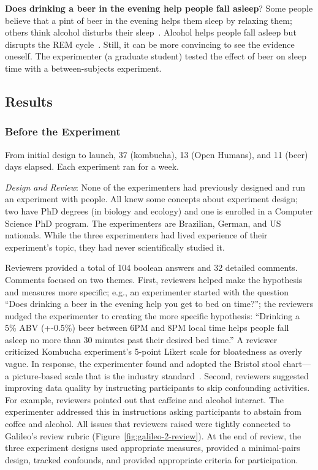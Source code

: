 \textbf{Does drinking a beer in the evening help people fall asleep}? Some people believe that a pint of beer in the evening helps them sleep by relaxing them; others think alcohol disturbs their sleep~\cite{Ph.D.}. Alcohol helps people fall asleep but disrupts the REM cycle~\cite{Ebrahim2013}. Still, it can be more convincing to see the evidence oneself. The experimenter (a graduate student) tested the effect of beer on sleep time with a between-subjects experiment. 

\subsection*{Results}
\subsubsection{Before the Experiment}
From initial design to launch, 37 (kombucha), 13 (Open Humans), and 11 (beer) days elapsed. Each experiment ran for a week.

\textit{Design and Review}: None of the experimenters had previously designed and run an experiment with people. All knew some concepts about experiment design; two have PhD degrees (in biology and ecology) and one is enrolled in a Computer Science PhD program. The experimenters are Brazilian, German, and US nationals. While the three experimenters had lived experience of their experiment's topic, they had never scientifically studied it.

Reviewers provided a total of 104 boolean answers and 32 detailed comments. Comments focused on two themes. First, reviewers helped make the hypothesis and measures more specific; e.g., an experimenter started with the question “Does drinking a beer in the evening help you get to bed on time?”; the reviewers nudged the experimenter to creating the more specific hypothesis: “Drinking a 5\% ABV (+-0.5\%) beer between 6PM and 8PM local time helps people fall asleep no more than 30 minutes past their desired bed time.” A reviewer criticized Kombucha experiment's 5-point Likert scale for bloatedness as overly vague. In response, the experimenter found and adopted the Bristol stool chart---a picture-based scale that is the industry standard~\cite{Wikipedia2018}. Second, reviewers suggested improving data quality by instructing participants to skip confounding activities. For example, reviewers pointed out that caffeine and alcohol interact. The experimenter addressed this in instructions asking participants to abstain from coffee and alcohol. All issues that reviewers raised were tightly connected to Galileo's review rubric (Figure~\ref{fig:galileo-2-review}). At the end of review, the three experiment designs used appropriate measures, provided a minimal-pairs design, tracked confounds, and provided appropriate criteria for participation.

